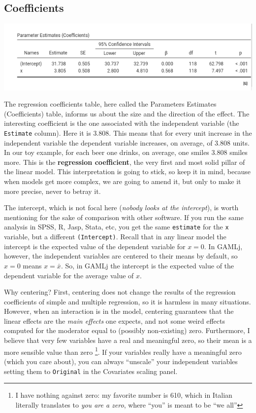 \documentclass[
]{book}
\begin{document}
\hypertarget{glmcoefs}{%
\subsection{Coefficients}\label{glmcoefs}}

\includegraphics[width=0.9\linewidth]{bookletpics/2_output5}

The regression coefficients table, here called the {Parameters Estimates (Coefficients)} table, informs us about the size and the direction of the effect. The interesting coefficient is the one associated with the independent variable (the \texttt{Estimate} column). Here it is \(3.808\). This means that for every unit increase in the independent variable the dependent variable increases, on average, of \(3.808\) units. In our toy example, for each beer one drinks, on average, one smiles \(3.808\) smiles more. This is the \textbf{regression coefficient}, the very first and most solid pillar of the linear model. This interpretation is going to stick, so keep it in mind, because when models get more complex, we are going to amend it, but only to make it more precise, never to betray it.

The intercept, which is not focal here (\emph{nobody looks at the intercept}), is worth mentioning for the sake of comparison with other software. If you run the same analysis in SPSS, R, Jasp, Stata, etc, you get the same \texttt{estimate} for the \texttt{x} variable, but a different \texttt{(Intercept)}. Recall that in any linear model the intercept is the expected value of the dependent variable for \(x=0\). In {GAMLj}, however, the independent variables are centered to their means by default, so \(x=0\) means \(x=\bar{x}\). So, in {GAMLj} the intercept is the expected value of the dependent variable for the average value of \(x\).

Why centering? First, centering does not change the results of the regression coefficients of simple and multiple regression, so it is harmless in many situations. However, when an interaction is in the model, centering guarantees that the linear effects are the \emph{main effects} one expects, and not some weird effects computed for the moderator equal to (possibly non-existing) zero. Furthermore, I believe that very few variables have a real and meaningful zero, so their mean is a more sensible value than zero \footnote{I have nothing against zero: my favorite number is 610, which in Italian literally translates to \emph{you are a zero}, where ``you'' is meant to be ``we all''}. If your variables really have a meaningful zero (which you care about), you can always ``unscale'' your independent variables setting them to \texttt{Original} in the {Covariates scaling} panel.
\end{document}
